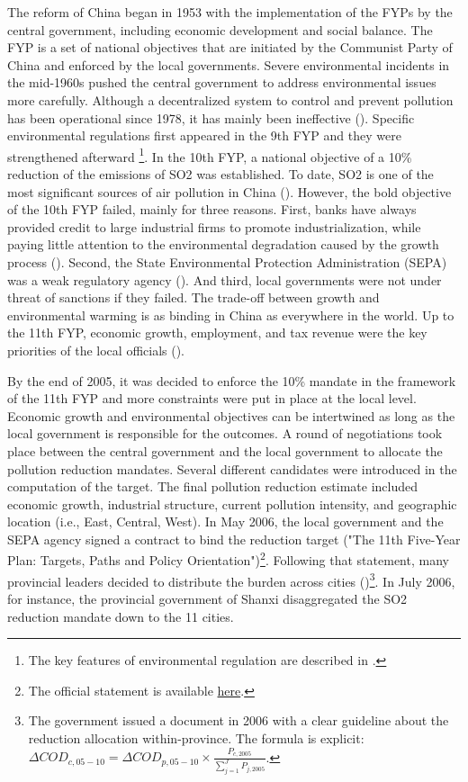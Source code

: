 \documentclass[12pt]{article}
\begin{document}
The reform of China began in 1953 with the implementation of the FYPs by the central government, including economic development and social balance. The FYP is a set of national objectives that are initiated by the Communist Party of China and enforced by the local governments. Severe environmental incidents in the mid-1960s pushed the central government to address environmental issues more carefully. Although a decentralized system to control and prevent pollution has been operational since 1978, it has mainly been ineffective (\cite{Xu2009-yw}). Specific environmental regulations first appeared in the 9th FYP and they were strengthened afterward \footnote{The key features of environmental regulation are described in \cite{Xu2011-sw}.}. In the 10th FYP, a national objective of a 10\% reduction of the emissions of SO2 was established. To date, SO2 is one of the most significant sources of air pollution in China (\cite{Yan2017-le}). However, the bold objective of the 10th FYP failed, mainly for three reasons. First, banks have always provided credit to large industrial firms to promote industrialization, while paying little attention to the environmental degradation caused by the growth process (\cite{The_World_Bank2008-pn}). Second, the State Environmental Protection Administration (SEPA) was a weak regulatory agency (\cite{Stoerk2018-mx}). And third, local governments were not under threat of sanctions if they failed. The trade-off between growth and environmental warming is as binding in China as everywhere in the world. Up to the 11th FYP, economic growth, employment, and tax revenue were the key priorities of the local officials (\cite{Jiang2014-pf, Chen2018-ki}).

By the end of 2005, it was decided to enforce the 10\% mandate in the framework of the 11th FYP and more constraints were put in place at the local level. Economic growth and environmental objectives can be intertwined as long as the local government is responsible for the outcomes. A round of negotiations took place between the central government and the local government to allocate the pollution reduction mandates. Several different candidates were introduced in the computation of the target. The final pollution reduction estimate included economic growth, industrial structure, current pollution intensity, and geographic location (i.e., East, Central, West). In May 2006, the local government and the SEPA agency signed a contract to bind the reduction target ("The 11th Five-Year Plan: Targets, Paths and Policy Orientation")\footnote{The official statement is available \href{http://en.ndrc.gov.cn/newsrelease/200603/t20060323_63813.html}{here}.}. Following that statement, many provincial leaders decided to distribute the burden across cities (\cite{Liu2017-ib})\footnote{The government issued a document in 2006 with a clear guideline about the reduction allocation within-province. The formula is explicit: $\Delta C O D_{c, 05-10}=\Delta C O D_{p, 05-10} \times \frac{P_{c, 2005}}{\sum_{j=1}^{J} P_{j, 2005}}$.}. In July 2006, for instance, the provincial government of Shanxi disaggregated the SO2 reduction mandate down to the 11 cities.
\end{document}
